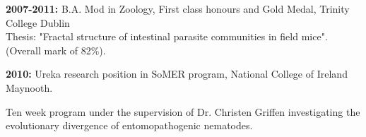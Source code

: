 \documentclass[10pt,a4paper]{article}
\begin{document}

\textbf{2007-2011:} B.A. Mod in Zoology, First class honours and Gold Medal, Trinity College Dublin\\
Thesis: "Fractal structure of intestinal parasite communities in field mice". (Overall mark of 82\%).\bigskip

\textbf{2010:} Ureka research position in SoMER program, National College of Ireland Maynooth.\\
\par{\fontsize{10.5}{10}\selectfont Ten week program under the supervision of Dr. Christen Griffen investigating the evolutionary divergence of entomopathogenic nematodes.\bigskip}


\end{document}
